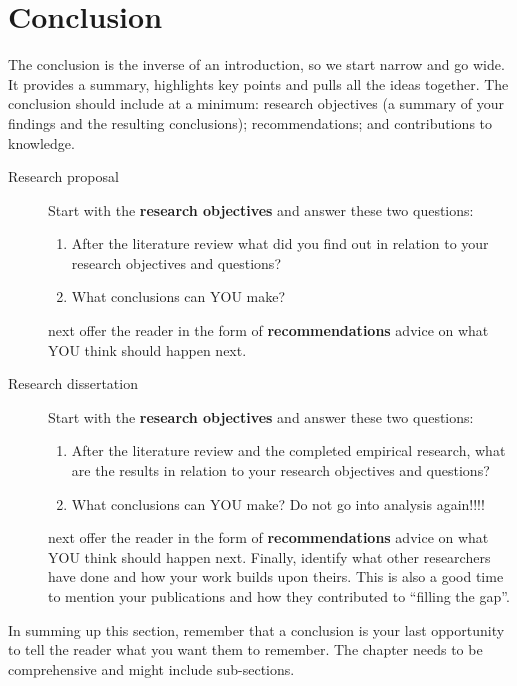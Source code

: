 %
%
%

\chapter{Conclusion}

\begin{theo}{}
The conclusion is the inverse of an introduction, so we start narrow and go wide. It provides a summary, highlights key points and pulls all the ideas together. The conclusion should include at a minimum: research objectives (a summary of your findings and the resulting conclusions); recommendations; and contributions to knowledge.

\begin{description}
\item[Research proposal] Start with the \textbf{research objectives} and answer these two questions:
\begin{enumerate}
\item After the literature review what did you find out in relation to your research objectives and questions?
\item What conclusions can YOU make?
\end{enumerate}
next offer the reader in the form of \textbf{recommendations} advice on what YOU think should happen next.

\item[Research dissertation] Start with the \textbf{research objectives} and answer these two questions:
\begin{enumerate}
\item After the literature review and the completed empirical research, what are the results in relation to your research objectives and questions?
\item What conclusions can YOU make? Do not go into analysis again!!!!
\end{enumerate}
next offer the reader in the form of \textbf{recommendations} advice on what YOU think should happen next. Finally, identify what other researchers have done and how your work builds upon theirs. This is also a good time to mention your publications and how they contributed to ``filling the gap''.

\end{description}

In summing up this section, remember that a conclusion is your last opportunity to tell the reader what you want them to remember. The chapter needs to be comprehensive and might include sub-sections.

\end{theo}
